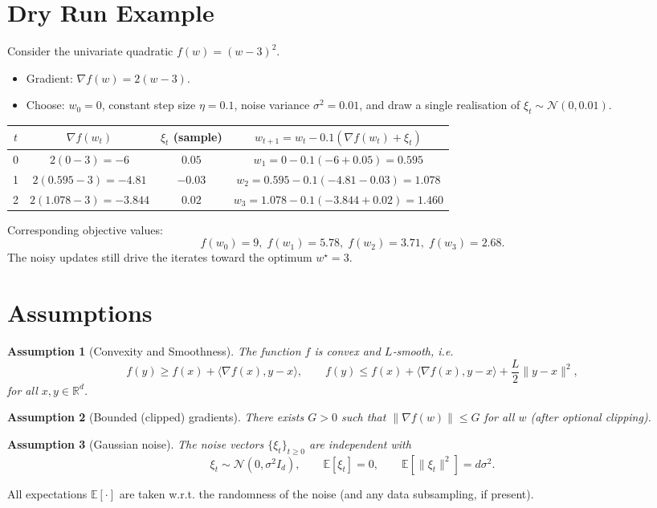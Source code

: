 \documentclass{article}
\newtheorem{assumption}{Assumption}
\newcommand{\E}{\mathbb{E}}
\newcommand{\R}{\mathbb{R}}
\begin{document}
\section*{Dry Run Example}
Consider the univariate quadratic $f(w)=(w-3)^2$.
\begin{itemize}
\item Gradient: $\nabla f(w)=2(w-3)$.
\item Choose: $w_0=0$, constant step size $\eta=0.1$, noise variance $\sigma^2=0.01$, and draw a single realisation of $\xi_t\sim\mathcal N(0,0.01)$.
\end{itemize}
\begin{center}
\begin{tabular}{c|c|c|c}
$t$ & $\nabla f(w_t)$ & $\xi_t$ (sample) & $w_{t+1}=w_t-0.1(\nabla f(w_t)+\xi_t)$ \\ \hline
0 & $2(0-3)=-6$ & $0.05$ & $w_1=0-0.1(-6+0.05)=0.595$ \\
1 & $2(0.595-3)=-4.81$ & $-0.03$ & $w_2=0.595-0.1(-4.81-0.03)=1.078$ \\
2 & $2(1.078-3)=-3.844$ & $0.02$ & $w_3=1.078-0.1(-3.844+0.02)=1.460$ 
\end{tabular}
\end{center}
Corresponding objective values:
\[
f(w_0)=9,\; f(w_1)=5.78,\; f(w_2)=3.71,\; f(w_3)=2.68.
\]
The noisy updates still drive the iterates toward the optimum $w^\star=3$.

\newpage
\section*{Assumptions}
\begin{assumption}[Convexity and Smoothness]\label{as:convex}
The function $f$ is convex and $L$‑smooth, i.e.
\[
f(y)\ge f(x)+\langle\nabla f(x),y-x\rangle,\qquad
f(y)\le f(x)+\langle\nabla f(x),y-x\rangle+\frac{L}{2}\|y-x\|^2,
\]
for all $x,y\in\R^{d}$.
\end{assumption}
\begin{assumption}[Bounded (clipped) gradients]\label{as:gradbound}
There exists $G>0$ such that $\|\nabla f(w)\|\le G$ for all $w$ (after optional clipping).
\end{assumption}
\begin{assumption}[Gaussian noise]\label{as:noise}
The noise vectors $\{\xi_t\}_{t\ge0}$ are independent with
\[
\xi_t\sim\mathcal N(0,\sigma^2 I_d),\qquad 
\E[\xi_t]=0,\qquad \E[\|\xi_t\|^2]=d\sigma^2.
\]
\end{assumption}
All expectations $\E[\cdot]$ are taken w.r.t. the randomness of the noise (and any data subsampling, if present).
\end{document}

